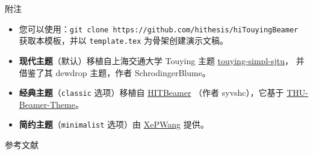 \documentclass[aspectratio=169]{ctexbeamer} %
\begin{document}
\begin{frame}{附注}
  \begin{itemize}
    \item 您可以使用：\texttt{git clone
      https://github.com/hithesis/hiTouyingBeamer}
      获取本模板，并以 \texttt{template.tex} 为骨架创建演示文稿。
    \item \textbf{现代主题}（默认）移植自上海交通大学 Touying 主题
      \href{https://github.com/sjtug/touying-sjtu}{touying-simpl-sjtu}，
      并借鉴了其 dewdrop 主题，作者 SchrodingerBlume。
    \item \textbf{经典主题}（\texttt{classic} 选项）移植自
      \href{https://github.com/hithesis/HITBeamer}{HITBeamer}
      （作者 syvshc），它基于
      \href{https://github.com/Trinkle23897/THU-Beamer-Theme}{THU-Beamer-Theme}。
    \item \textbf{简约主题}（\texttt{minimalist} 选项）由
      \href{https://github.com/XePWang}{XePWang} 提供。
  \end{itemize}
\end{frame}

\begin{frame}{参考文献}
  \printbibliography[heading=none]
\end{frame}


\end{document}
